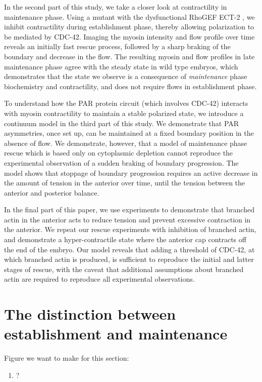 \documentclass[11pt]{article}
\newcommand{\red}[1]{\color{red}#1\normalcolor}
\newcommand{\6}[1]{#1_{\text{6}}}
\newcommand{\3}[1]{#1_{\text{3}}}
\begin{document}
In the second part of this study, we take a closer look at contractility in maintenance phase. Using a mutant with the dysfunctional RhoGEF ECT-2 \cite{zonies2010symmetry}, we inhibit contractility during establishment phase, thereby allowing polarization to be mediated by CDC-42. Imaging the myosin intensity and flow profile over time reveals an initially fast rescue process, followed by a sharp braking of the boundary and decrease in the flow. The resulting myosin and flow profiles in late maintenance phase agree with the steady state in wild type embryos, which demonstrates that the state we observe is a consequence of \emph{maintenance} phase biochemistry and contractility, and does not require flows in establishment phase.

To understand how the PAR protein circuit (which involves CDC-42) interacts with myosin contractility to maintain a stable polarized state, we introduce a continuum model in the third part of this study. We demonstrate that PAR asymmetries, once set up, can be maintained at a fixed boundary position in the absence of flow. We demonstrate, however, that a model of maintenance phase rescue which is based only on cytoplasmic depletion \cite{goehring2011polarization} cannot reproduce the experimental observation of a sudden braking of boundary progression. The model shows that stoppage of boundary progression requires an active decrease in the amount of tension in the anterior over time, until the tension between the anterior and posterior balance. 

In the final part of this paper, we use experiments to demonstrate that branched actin in the anterior acts to reduce tension \cite{muresan2022f, yang2012arp2} and prevent excessive contraction in the anterior. We repeat our rescue experiments with inhibition of branched actin, and demonstrate a hyper-contractile state where the anterior cap contracts off the end of the embryo. Our model reveals that adding a threshold of CDC-42, at which branched actin is produced, is sufficient to reproduce the initial and latter stages of rescue, with the caveat that additional assumptions about branched actin are required to reproduce all experimental observations.
\fi

\section{The distinction between establishment and maintenance}

\red{Figure we want to make for this section:
\begin{enumerate}[label=(\alph*),topsep=0pt,itemsep=-2ex]
\item ?
\end{enumerate}
}
\end{document}
